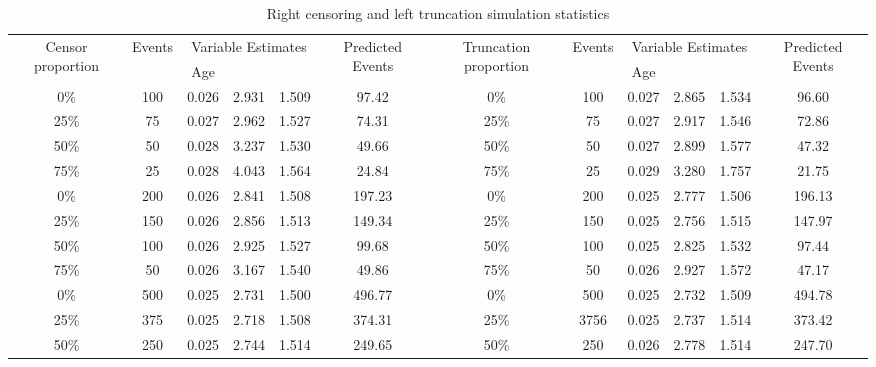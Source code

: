 \documentclass[12pt,letterpaper]{article}
\begin{document}
\begin{table}[htbp]
	\renewcommand{\arraystretch}{1.5}
	\scriptsize %
	\centering
	\caption{Right censoring and left truncation simulation statistics}
	
	\begin{tabular}{cccccc||cccccc}
		\hline
		\multicolumn{1}{c}{\multirow{2}{1.5cm}{Censor proportion}} & \multicolumn{1}{c}{\multirow{2}[3]{*}{Events}} & \multicolumn{3}{c}{Variable Estimates} & \multicolumn{1}{c}{\multirow{2}{1cm}{Predicted Events}} & \multicolumn{1}{c}{\multirow{2}{1.5cm}{Truncation proportion}} & \multicolumn{1}{c}{\multirow{2}[3]{*}{Events}} & \multicolumn{3}{c}{Variable Estimates} & \multicolumn{1}{c}{\multirow{2}{1cm}{Predicted Events}} \\
		\cline{3-5}
	    \cline{9-11}
		\multicolumn{1}{c}{} & \multicolumn{1}{c}{} & Age   & \lambda & \alpha & \multicolumn{1}{c}{} & \multicolumn{1}{c}{} & \multicolumn{1}{c}{} & Age   & \lambda & \alpha & \multicolumn{1}{c}{} \\
		\hline
				0\%   & 100   & 0.026 & 2.931 & 1.509 & 97.42 & 0\%   & 100 & 0.027 & 2.865 & 1.534 & 96.60 \\
				25\%  & 75    & 0.027 & 2.962 & 1.527 & 74.31 & 25\%  & 75 & 0.027 & 2.917 & 1.546 & 72.86 \\
				50\%  & 50    & 0.028 & 3.237 & 1.530 & 49.66 & 50\%  & 50 & 0.027 & 2.899 & 1.577 & 47.32 \\
				75\%  & 25    & 0.028 & 4.043 & 1.564 & 24.84 & 75\%  & 25 & 0.029 & 3.280 & 1.757 & 21.75 \\
				0\%   & 200   & 0.026 & 2.841 & 1.508 & 197.23 & 0\%   & 200 & 0.025 & 2.777 & 1.506 & 196.13 \\
				25\%  & 150   & 0.026 & 2.856 & 1.513 & 149.34 & 25\%  & 150   & 0.025 & 2.756 & 1.515 & 147.97 \\
				50\%  & 100   & 0.026 & 2.925 & 1.527 & 99.68 & 50\%  & 100   & 0.025 & 2.825 & 1.532 & 97.44 \\
				75\%  & 50    & 0.026 & 3.167 & 1.540 & 49.86 & 75\%  & 50    & 0.026 & 2.927 & 1.572 & 47.17 \\
				0\%   & 500   & 0.025 & 2.731 & 1.500 & 496.77 & 0\%   & 500 & 0.025 & 2.732 & 1.509 & 494.78 \\
				25\%  & 375   & 0.025 & 2.718 & 1.508 & 374.31 & 25\%  & 3756 & 0.025 & 2.737 & 1.514 & 373.42 \\
				50\%  & 250   & 0.025 & 2.744 & 1.514 & 249.65 & 50\%  & 250 & 0.026 & 2.778 & 1.514 & 247.70 \\

\end{tabular}
\end{table}
\end{document}
